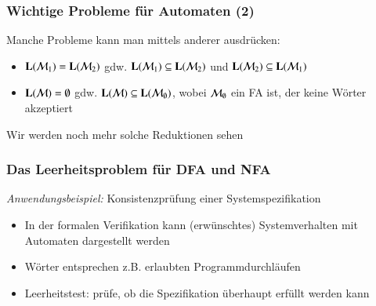 \documentclass[aspectratio=1610,onlymath]{beamer}
\begin{document}
\begin{frame}\frametitle{Wichtige Probleme für Automaten (2)}



\pause

Manche Probleme kann man mittels anderer ausdrücken:
\begin{itemize}
\item $\textbf{\textcolor{black}{L}}(\mathcal{M}_1)=\textbf{\textcolor{black}{L}}(\mathcal{M}_2)$ gdw. $\textbf{\textcolor{black}{L}}(\mathcal{M}_1)\subseteq\textbf{\textcolor{black}{L}}(\mathcal{M}_2)$ und $\textbf{\textcolor{black}{L}}(\mathcal{M}_2)\subseteq\textbf{\textcolor{black}{L}}(\mathcal{M}_1)$
\item $\textbf{\textcolor{black}{L}}(\mathcal{M})=\emptyset$ gdw. $\textbf{\textcolor{black}{L}}(\mathcal{M})\subseteq\textbf{\textcolor{black}{L}}(\mathcal{M}_\emptyset)$, wobei 
$\mathcal{M}_\emptyset$ ein FA ist, der keine Wörter akzeptiert
\end{itemize}
Wir werden noch mehr solche \alert{Reduktionen} sehen

\end{frame}

\begin{frame}\frametitle{Das Leerheitsproblem für DFA und NFA}


\emph{Anwendungsbeispiel:}
Konsistenzprüfung einer Systemspezifikation
\begin{itemize}
\item In der formalen Verifikation kann (erwünschtes) Systemverhalten mit Automaten dargestellt werden
\item Wörter entsprechen z.B. erlaubten Programmdurchläufen
\item Leerheitstest: prüfe, ob die Spezifikation überhaupt erfüllt werden kann
\end{itemize}

\end{frame}
\end{document}
